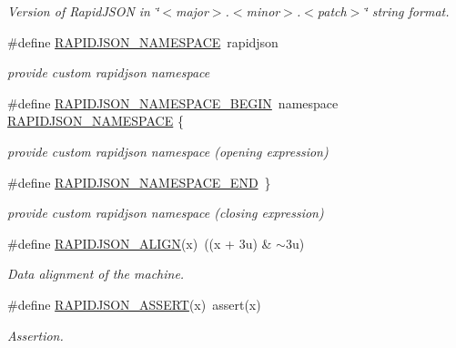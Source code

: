 \begin{DoxyCompactItemize}
\begin{DoxyCompactList}\small\item\em Version of Rapid\+J\+S\+ON in \char`\"{}$<$major$>$.$<$minor$>$.$<$patch$>$\char`\"{} string format. \end{DoxyCompactList}\item 
\#define \hyperlink{group__RAPIDJSON__CONFIG_ga743a79d3af927391fe3eb5c979136899}{R\+A\+P\+I\+D\+J\+S\+O\+N\+\_\+\+N\+A\+M\+E\+S\+P\+A\+CE}~rapidjson
\begin{DoxyCompactList}\small\item\em provide custom rapidjson namespace \end{DoxyCompactList}\item 
\#define \hyperlink{group__RAPIDJSON__CONFIG_gad3806c8251fdc7da9618b7e922674ffc}{R\+A\+P\+I\+D\+J\+S\+O\+N\+\_\+\+N\+A\+M\+E\+S\+P\+A\+C\+E\+\_\+\+B\+E\+G\+IN}~namespace \hyperlink{group__RAPIDJSON__CONFIG_ga743a79d3af927391fe3eb5c979136899}{R\+A\+P\+I\+D\+J\+S\+O\+N\+\_\+\+N\+A\+M\+E\+S\+P\+A\+CE} \{
\begin{DoxyCompactList}\small\item\em provide custom rapidjson namespace (opening expression) \end{DoxyCompactList}\item 
\#define \hyperlink{group__RAPIDJSON__CONFIG_gaf18f052a98b9f5df5448d39484b743c1}{R\+A\+P\+I\+D\+J\+S\+O\+N\+\_\+\+N\+A\+M\+E\+S\+P\+A\+C\+E\+\_\+\+E\+ND}~\}
\begin{DoxyCompactList}\small\item\em provide custom rapidjson namespace (closing expression) \end{DoxyCompactList}\item 
\#define \hyperlink{group__RAPIDJSON__CONFIG_ga583915242504c7fdb36e826f02f76242}{R\+A\+P\+I\+D\+J\+S\+O\+N\+\_\+\+A\+L\+I\+GN}(x)~((x + 3u) \& $\sim$3u)
\begin{DoxyCompactList}\small\item\em Data alignment of the machine. \end{DoxyCompactList}\item 
\#define \hyperlink{group__RAPIDJSON__CONFIG_gabeba18d612187bad2ac62aed9276d47c}{R\+A\+P\+I\+D\+J\+S\+O\+N\+\_\+\+A\+S\+S\+E\+RT}(x)~assert(x)
\begin{DoxyCompactList}\small\item\em Assertion. \end{DoxyCompactList}\end{DoxyCompactItemize}


